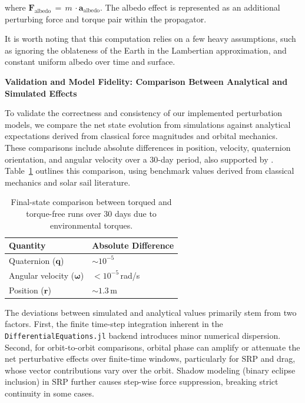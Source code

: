 \documentclass[final,3p,times,twocolumn]{elsarticle}
\begin{document}
\noindent where $\mathbf{F}_{\text{albedo}} \, = \, m \, \cdot \mathbf{a}_{\text{albedo}}$. The albedo effect is represented as an additional perturbing force and torque pair within the propagator.
\vspace{5pt}
\par\noindent It is worth noting that this computation relies on a few heavy assumptions, such as ignoring the oblateness of the Earth in the Lambertian approximation, and constant uniform albedo over time and surface. \vspace{7pt}

\noindent\textbf{Validation and Model Fidelity: Comparison Between Analytical and Simulated Effects} \vspace{2pt}
\par\noindent To validate the correctness and consistency of our implemented perturbation models, we compare the net state evolution from simulations against analytical expectations derived from classical force magnitudes and orbital mechanics. These comparisons include absolute differences in position, velocity, quaternion orientation, and angular velocity over a 30-day period, also supported by \cite{smoothing}. Table~\ref{tab:torque_diff_only} outlines this comparison, using benchmark values derived from classical mechanics and solar sail literature.

\begin{table}[htbp]
\centering
\small
\begin{tabular}{p{3.5cm}p{3.0cm}}
\toprule
\textbf{Quantity} & \textbf{Absolute Difference} \\
\midrule
Quaternion ($\mathbf{q}$) & $\sim 10^{-5}$ \\
Angular velocity ($\boldsymbol{\omega}$) & $< 10^{-5}$\,rad/s \\
Position ($\mathbf{r}$) & $\sim 1.3$\,m \\
\bottomrule
\end{tabular}
\caption{Final-state comparison between torqued and torque-free runs over 30 days due to environmental torques.}
\label{tab:torque_diff_only}
\end{table}

\noindent The deviations between simulated and analytical values primarily stem from two factors. First, the finite time-step integration inherent in the \texttt{DifferentialEquations.jl} backend introduces minor numerical dispersion. Second, for orbit-to-orbit comparisons, orbital phase can amplify or attenuate the net perturbative effects over finite-time windows, particularly for \( \text{SRP} \) and drag, whose vector contributions vary over the orbit. Shadow modeling (binary eclipse inclusion) in \( \text{SRP} \) further causes step-wise force suppression, breaking strict continuity in some cases.
\end{document}
